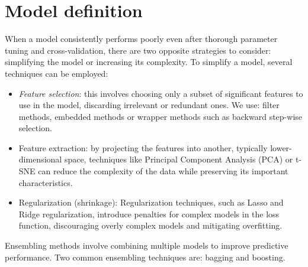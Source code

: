 \section{Model definition}

When a model consistently performs poorly even after thorough parameter tuning and cross-validation, there are two opposite strategies to consider: simplifying the model or increasing its complexity.
To simplify a model, several techniques can be employed:
\begin{itemize}
    \item \textit{Feature selection}: this involves choosing only a subset of significant features to use in the model, discarding irrelevant or redundant ones.
        We use: filter methods, embedded methods or wrapper methods such as backward step-wise selection. 
    \item Feature extraction: by projecting the features into another, typically lower-dimensional space, techniques like Principal Component Analysis (PCA) or t-SNE can reduce the complexity of the data while preserving its important characteristics.
    \item Regularization (shrinkage): Regularization techniques, such as Lasso and Ridge regularization, introduce penalties for complex models in the loss function, discouraging overly complex models and mitigating overfitting.
\end{itemize}
Ensembling methods involve combining multiple models to improve predictive performance. Two common ensembling techniques are: bagging and boosting. 





